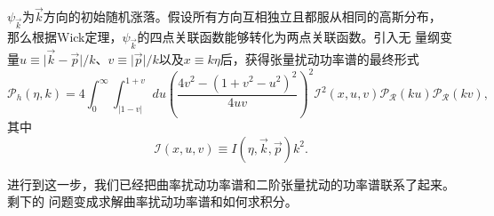 $\psi_{\vec{k}}$为$\vec{k}$方向的初始随机涨落。假设所有方向互相独立且都服从相同的高斯分布，
那么根据Wick定理，$\psi_{\vec{k}}$的四点关联函数能够转化为两点关联函数。引入无
量纲变量$u\equiv\lvert \vec{k}-\vec{p}\rvert /k$、$v\equiv \lvert
\vec{p}\rvert /k$以及$x\equiv k\eta$后，获得张量扰动功率谱的最终形式
\begin{equation}
  \label{eq:last-result-for-power-spectrum-of-second-tensor-perturbation}
  \mathcal{P}_{h}(\eta, k) = 4 \int_{0}^{\infty} \int_{\lvert
  1-v\rvert}^{1+v} du
  {\left(\frac{4v^2-{\left(1+v^2-u^2\right)}^2}{4uv}\right)}^2
  \mathcal{I}^2(x, u, v)\mathcal{P}_{\mathcal{R}}(ku)
  \mathcal{P}_{\mathcal{R}}(kv),  
\end{equation}
其中
\begin{equation}
  \label{eq:integral-function}
  \mathcal{I}(x, u,v) \equiv I(\eta, \vec{k}, \vec{p})k^2. 
\end{equation}

进行到这一步，我们已经把曲率扰动功率谱和二阶张量扰动的功率谱联系了起来。剩下的
问题变成求解曲率扰动功率谱和如何求积分。


